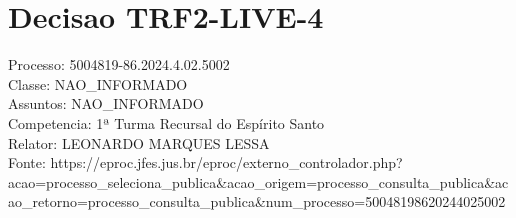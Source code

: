 \documentclass[12pt]{article}
\begin{document}
\section*{Decisao TRF2-LIVE-4}
Processo: 5004819-86.2024.4.02.5002\\
Classe: NAO\_INFORMADO\\
Assuntos: NAO\_INFORMADO\\
Competencia: 1ª Turma Recursal do Espírito Santo\\
Relator: LEONARDO MARQUES LESSA\\
Fonte: https://eproc.jfes.jus.br/eproc/externo\_controlador.php?acao=processo\_seleciona\_publica\&acao\_origem=processo\_consulta\_publica\&acao\_retorno=processo\_consulta\_publica\&num\_processo=50048198620244025002
\end{document}
